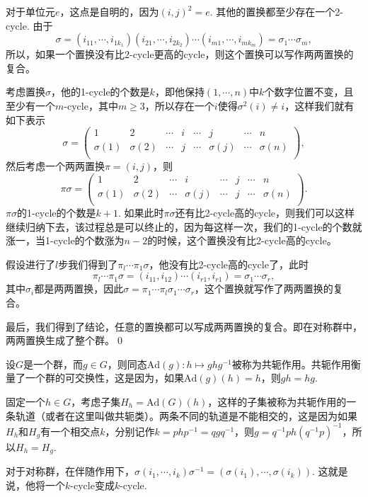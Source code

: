 \documentclass[9pt]{extarticle}
\begin{document}
\proof 对于单位元$e$，这点是自明的，因为$(i,j)^2=e$. 其他的置换都至少存在一个2-cycle. 由于
\[
	\sigma=(i_{11},\cdots,i_{1k_1})(i_{21},\cdots,i_{2k_2})\cdots (i_{m1},\cdots,i_{mk_m})=\sigma_1 \cdots \sigma_m,
\]
所以，如果一个置换没有比$2$-cycle更高的cycle，则这个置换可以写作两两置换的复合。

考虑置换$\sigma$，他的1-cycle的个数是$k$，即他保持$(1,\cdots,n)$中$k$个数字位置不变，且至少有一个$m$-cycle，其中$m\geq 3$，所以存在一个$i$使得$\sigma^2(i)\neq i$，这样我们就有如下表示
\[
	\sigma=\begin{pmatrix}
	1&2&\cdots&i&\cdots &j&\cdots&n\\
	\sigma(1)&\sigma(2)&\cdots&j&\cdots &\sigma(j)&\cdots&\sigma(n)\\
	\end{pmatrix},
\]
然后考虑一个两两置换$\pi=(i,j)$，则
\[
	\pi\sigma=\begin{pmatrix}
	1&2&\cdots&i&\cdots &j&\cdots&n\\
	\sigma(1)&\sigma(2)&\cdots&\sigma(j)&\cdots &j&\cdots&\sigma(n)\\
	\end{pmatrix}.
\]
$\pi\sigma$的1-cycle的个数是$k+1$. 如果此时$\pi\sigma$还有比2-cycle高的cycle，则我们可以这样继续归纳下去，该过程总是可以终止的，因为每这样一次，我们的1-cycle的个数就涨一，当1-cycle的个数涨为$n-2$的时候，这个置换没有比2-cycle高的cycle。

假设进行了$l$步我们得到了$\pi_l\cdots\pi_1 \sigma$，他没有比2-cycle高的cycle了，此时
\[
\pi_l\cdots\pi_1 \sigma=(i_{11},i_{12}) \cdots  (i_{r1},i_{r1})=\sigma_1 \cdots  \sigma_r,
\]
其中$\sigma_i$都是两两置换，因此$\sigma=\pi_1\cdots\pi_l\sigma_1\cdots \sigma_r$，这个置换就写作了两两置换的复合。

最后，我们得到了结论，任意的置换都可以写成两两置换的复合。即在对称群中，两两置换生成了整个群。\qed

\para 设$G$是一个群，而$g\in G$，则同态$\mathrm{Ad}(g):h\mapsto ghg^{-1}$被称为共轭作用。共轭作用衡量了一个群的可交换性，这是因为，如果$\mathrm{Ad}(g)(h)=h$，则$gh=hg$.

固定一个$h\in G$，考虑子集$H_h=\mathrm{Ad}(G)(h)$，这样的子集被称为共轭作用的一条轨道（或者在这里叫做共轭类）。两条不同的轨道是不能相交的，这是因为如果$H_h$和$H_g$有一个相交点$k$，分别记作$k=php^{-1}=qgq^{-1}$，则$g=q^{-1}ph(q^{-1}p)^{-1}$，所以$H_h=H_g$.

\pro 对于对称群，在伴随作用下，$\sigma (i_1,\cdots,i_k)\sigma^{-1}= (\sigma(i_1),\cdots,\sigma(i_k))$. 
这就是说，他将一个$k$-cycle变成$k$-cycle.
\end{document}
